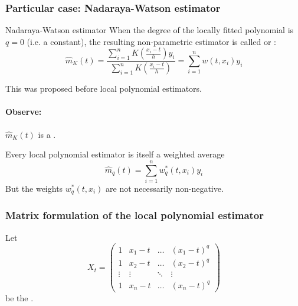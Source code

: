 \subsubsection{Particular case: Nadaraya-Watson estimator}
\begin{definition}{Nadaraya-Watson estimator}{}
	When the degree of the locally fitted polynomial is \emph{$q=0$} (i.e. a constant),
	the resulting non-parametric estimator is called 
	or :
	\begin{equation*}
		\hat m_K(t) = \frac{
			\sum_{i=1}^n K \left( \frac{x_i - t}{h} \right) y_i
		}{
			\sum_{i=1}^n K \left( \frac{x_i - t}{h} \right)
		} = \sum_{i=1}^n w(t, x_i) y_i
	\end{equation*}
	\tcblower

	This was proposed before local polynomial estimators.

	\begin{note}
		\paragraph{Observe:} $\hat m_K(t)$ is a .
	\end{note}

\end{definition}


\begin{prop}{Every local polynomial estimator is itself a weighted average}{}
	\begin{equation*}
		\hat m_{q}(t) = \sum_{i=1}^n w_q^*(t, x_i) y_i
	\end{equation*}
	But the weights $w_q^*(t, x_i)$ are not necessarily non-negative.
\end{prop}

\subsubsection{Matrix formulation of the local polynomial estimator}
Let
\begin{equation*}
	X_t = \begin{pmatrix}
		1      & x_1 - t & \ldots & (x_1 - t)^q \\
		1      & x_2 - t & \ldots & (x_2 - t)^q \\
		\vdots & \vdots  & \ddots & \vdots      \\
		1      & x_n - t & \ldots & (x_n - t)^q
	\end{pmatrix}
\end{equation*}
be the .

